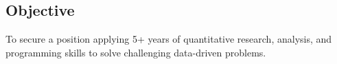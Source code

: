 \documentclass[margin,line]{res}
\begin{document}
\begin{resume}


\section{\sc Objective} 
To secure a position applying 5+ years of quantitative research,
analysis, and programming skills to solve challenging data-driven
problems.



\end{resume}
\end{document}
